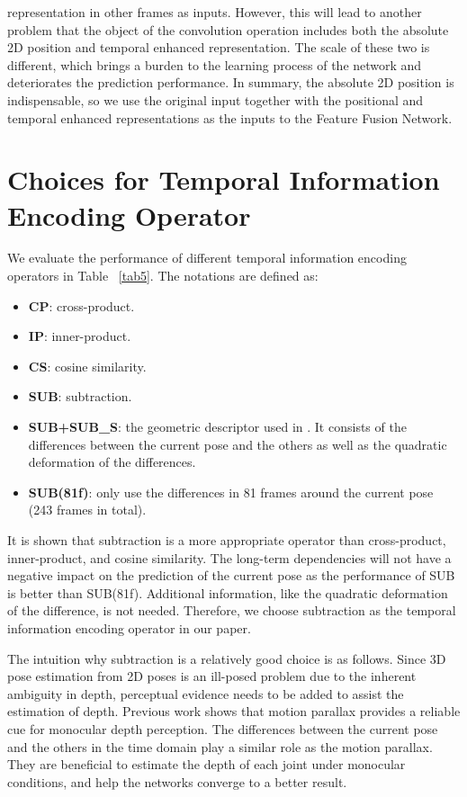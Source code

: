 \documentclass[sigconf]{acmart}
\begin{document}
\begin{multicols}{2}
\noindent representation in other frames as inputs. However, this will lead to another problem that the object of the convolution operation includes both the absolute 2D position and temporal enhanced representation. The scale of these two is different, which brings a burden to the learning process of the network and deteriorates the prediction performance. In summary, the absolute 2D position is indispensable, so we use the original input together with the positional and temporal enhanced representations as the inputs to the Feature Fusion Network.

\section{Choices for Temporal Information Encoding Operator} We evaluate the performance of different temporal information encoding operators in Table ~\ref{tab5}. The notations are defined as:
\begin{itemize}
 \item \textbf{CP}: cross-product.
 \item \textbf{IP}: inner-product.
 \item \textbf{CS}: cosine similarity.
  \item \textbf{SUB}: subtraction.
  \item \textbf{SUB+SUB\_S}: the geometric descriptor used in . It consists of the differences between the current pose and the others as well as the quadratic deformation of the differences.
  \item \textbf{SUB(81f)}: only use the differences in 81 frames around the current pose (243 frames in total).
  
\end{itemize}
It is shown that subtraction is a more appropriate operator than cross-product, inner-product, and cosine similarity. The long-term dependencies will not have a negative impact on the prediction of the current pose as the performance of SUB is better than SUB(81f). Additional information, like the quadratic deformation of the difference, is not needed. Therefore, we choose subtraction as the temporal information encoding operator in our paper.


The intuition why subtraction is a relatively good choice is as follows. Since 3D pose estimation from 2D poses is an ill-posed problem due to the inherent ambiguity in depth, perceptual evidence needs to be added to assist the estimation of depth. Previous work  shows that motion parallax provides a reliable cue for monocular depth perception. The differences between the current pose and the others in the time domain play a similar role as the motion parallax. They are beneficial to estimate the depth of each joint under monocular conditions, and help the networks converge to a better result.


\end{multicols}
\end{document}

